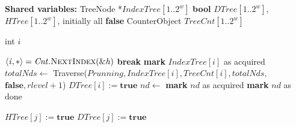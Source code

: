 
\begin{algorithm}[htbp]
    \footnotesize
    \vspace*{2mm}
    
    \begin{algorithmic}[1]
    
    \State \textbf{Shared variables:}
    \State TreeNode *$\mathit{IndexTree}[1..2^w]$ \label{alg:ps:r}
    \State \textbf{bool} $\mathit{DTree[1..2^w]}$, $\mathit{HTree[1..2^w]}$, initially all \textbf{false} \label{alg:ps:c}
    \State CounterObject $\mathit{TreeCnt[1..2^w]}$
    
    \vspace*{1mm}
        \State int $\mathit{i}$
    
            \State $\mathit{\langle i, * \rangle = Cnt.\mbox{\sc NextIndex}(\&h)}$ \label{alg:ps:help:c:cnt}
                \State \textbf{break}
            \EndIf
                \State \textbf{mark} $\mathit{IndexTree[i]}$ as acquired
                \State $\mathit{totalNds} \gets$ 
                \State Traverse($\mathit{Prunning, IndexTree[i], TreeCnt[i], totalNds,}$
                \Statex \quad $\mathit{\textbf{false}, rlevel+1}$) \label{alg:ps:help:c:rec}                
                \State $\mathit{DTree[i] := \textbf{true}}$ \label{alg:ps:help:c:true}
            \Else
                \State $\mathit{nd} \gets$  \label{alg:ps:findnode}
                \State \textbf{mark} $\mathit{nd}$ as acquired
                \State {} \label{alg:ps:prunning}
                \State \textbf{mark} $\mathit{nd}$ as done
            \EndIf
        \EndWhile
    
         \label{alg:ps:scan:for}
            \State {}  \label{alg:ps:help:backoff}
             \label{alg:ps:help:if}
                \State $\mathit{HTree[j] := \textbf{true}}$ \label{alg:ps:h:true}
                \State {}
            \EndIf
            \State $\mathit{DTree[j] := \textbf{true}}$ \label{alg:ps:help:c:true:helping}
        \EndFor
    \EndProcedure
    

\end{algorithmic}
\end{algorithm}
